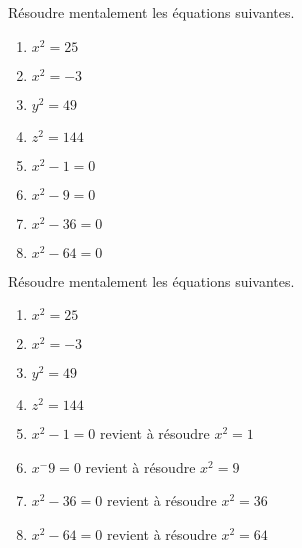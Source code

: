 \begin{exercice*}
    Résoudre mentalement les équations suivantes.
    \begin{multicols}{2}
        \begin{enumerate}
            \item $x^2=25$
            \item $x^2=-3$
            \item $y^2=49$
            \item $z^2=144$
            \item $x^2-1=0$
            \item $x^2-9=0$
            \item $x^2-36=0$
            \item $x^2-64=0$
        \end{enumerate}
    \end{multicols}
\end{exercice*}
\begin{corrige}
    Résoudre mentalement les équations suivantes.

    \begin{enumerate}
        \item $x^2=25$
        
        \item $x^2=-3$
        
        \item $y^2=49$
        
        \item $z^2=144$
        
        \item $x^2-1=0$ revient à résoudre $x^2=1$
        
        \item $x^-9=0$ revient à résoudre $x^2=9$
        
    \end{enumerate}
    \Coupe
    \begin{enumerate}
        \setcounter{enumi}{6}
        \item $x^2-36=0$ revient à résoudre $x^2=36$
        
        \item $x^2-64=0$ revient à résoudre $x^2=64$
        
    \end{enumerate}
\end{corrige}
